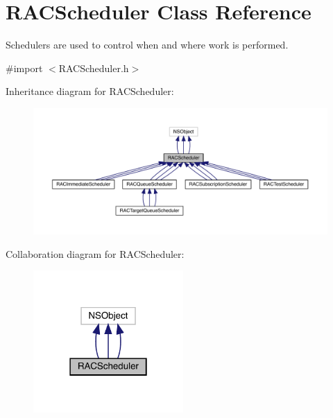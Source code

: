 \hypertarget{interface_r_a_c_scheduler}{}\section{R\+A\+C\+Scheduler Class Reference}
\label{interface_r_a_c_scheduler}


Schedulers are used to control when and where work is performed.  




{\ttfamily \#import $<$R\+A\+C\+Scheduler.\+h$>$}



Inheritance diagram for R\+A\+C\+Scheduler\+:\nopagebreak
\begin{figure}[H]
\begin{center}
\leavevmode
\includegraphics[width=350pt]{interface_r_a_c_scheduler__inherit__graph}
\end{center}
\end{figure}


Collaboration diagram for R\+A\+C\+Scheduler\+:\nopagebreak
\begin{figure}[H]
\begin{center}
\leavevmode
\includegraphics[width=162pt]{interface_r_a_c_scheduler__coll__graph}
\end{center}
\end{figure}
